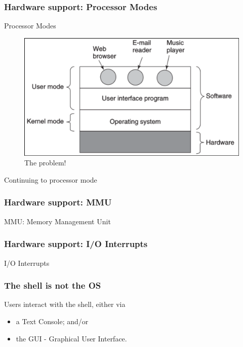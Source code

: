 \begin{frame}
    \frametitle{Hardware support: Processor Modes}
    
    Processor Modes
    \begin{figure}
        \includegraphics[scale=0.5]{images/101.png}
        \caption{The problem!}
    \end{figure}
    Continuing to processor mode

\end{frame}

\begin{frame}
    \frametitle{Hardware support: MMU}
    
    MMU: Memory Management Unit
    
\end{frame}

\begin{frame}
    \frametitle{Hardware support: I/O Interrupts}
    
    I/O Interrupts
    
\end{frame}

\begin{frame}
    \frametitle{The shell is not the OS}
    
    Users interact with the shell, either via 
    \begin{itemize}
        \item a Text Console; and/or
        \item the GUI - Graphical User Interface.
    \end{itemize}

\end{frame}


